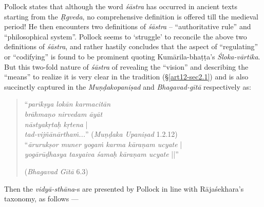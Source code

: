 Pollock states that although the word {\sl śāstra} has occurred in ancient texts starting from the {\sl Ṛgveda}, no comprehensive deﬁnition is offered till the medieval period! He then encounters two deﬁnitions of {\sl śāstra} -- ``authoritative rule'' and ``philosophical system''. Pollock seems to `struggle' to reconcile the above two deﬁnitions of {\sl śāstra}, and rather hastily concludes that the aspect of ``regulating'' or ``codifying'' is found to be prominent quoting Kumārila-bhaṭṭa's   {\sl Śloka-vārtika}. But this two-fold nature of {\sl śāstra} of revealing the ``vision'' and describing the ``means'' to realize it is very clear in the tradition (\S\ref{art12-sec2.1}) and is also succinctly captured in the {\sl Muṇḍakopaniṣad} and {\sl Bhagavad-gītā} respectively as: 
\begin{quote}
``{{\sl parīkṣya lokān karmacitān}}\\
{\sl brāhmaṇo nirvedam āyāt}\\
{\sl nāstyakṛtaḥ kṛtena} |\\
{\sl tad-vijñānārthaṁ...}'' ({\sl Muṇḍaka Upaniṣad} 1.2.12)\\
``{\sl ārurukṣor muner yogaṁ karma kāraṇam ucyate} |\\
{\sl yogārūḍhasya tasyaiva śamaḥ kāraṇam ucyate} ||'' 

\hfill ({\sl Bhagavad Gītā} 6.3)
\end{quote}

Then the {\sl vidyā-sthāna}-s are presented by Pollock in line with Rājaśekhara's taxonomy, as follows ---

\newpage

